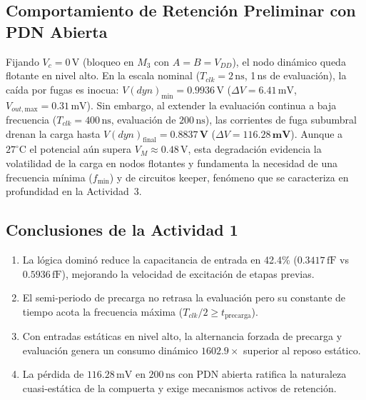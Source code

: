\subsection{Comportamiento de Retención Preliminar con PDN Abierta}
Fijando $V_c = 0\,\text{V}$ (bloqueo en $M_3$ con $A=B=V_{DD}$), el nodo dinámico queda flotante en nivel alto. En la escala nominal ($T_{clk} = 2\,\text{ns}$, 1\,ns de evaluación), la caída por fugas es inocua: $V(dyn)_{\text{min}} = 0.9936\,\text{V}$ ($\Delta V = 6.41\,\text{mV}$, $V_{out,\text{max}} = 0.31\,\text{mV}$). Sin embargo, al extender la evaluación continua a baja frecuencia ($T_{clk} = 400\,\text{ns}$, evaluación de $200\,\text{ns}$), las corrientes de fuga subumbral drenan la carga hasta $V(dyn)_{\text{final}} = \mathbf{0.8837\,\text{V}}$ ($\Delta V = \mathbf{116.28\,\text{mV}}$). Aunque a $27^\circ\text{C}$ el potencial aún supera $V_M \approx 0.48\,\text{V}$, esta degradación evidencia la volatilidad de la carga en nodos flotantes y fundamenta la necesidad de una frecuencia mínima ($f_{\text{min}}$) y de circuitos keeper, fenómeno que se caracteriza en profundidad en la Actividad~3.

\subsection{Conclusiones de la Actividad 1}
\begin{enumerate}[leftmargin=1.4em,itemsep=0.12em]
  \item La lógica dominó reduce la capacitancia de entrada en 42.4\% ($0.3417\,\text{fF}$ vs $0.5936\,\text{fF}$), mejorando la velocidad de excitación de etapas previas.
  \item El semi-periodo de precarga no retrasa la evaluación pero su constante de tiempo acota la frecuencia máxima ($T_{clk}/2 \ge t_{\text{precarga}}$).
  \item Con entradas estáticas en nivel alto, la alternancia forzada de precarga y evaluación genera un consumo dinámico $1602.9\times$ superior al reposo estático.
  \item La pérdida de $116.28\,\text{mV}$ en $200\,\text{ns}$ con PDN abierta ratifica la naturaleza cuasi-estática de la compuerta y exige mecanismos activos de retención.
\end{enumerate}
